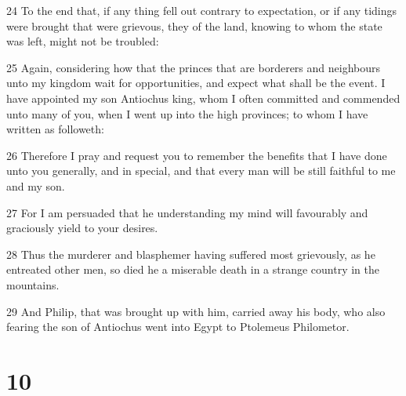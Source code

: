 \par 24 To the end that, if any thing fell out contrary to expectation, or if any tidings were brought that were grievous, they of the land, knowing to whom the state was left, might not be troubled:
\par 25 Again, considering how that the princes that are borderers and neighbours unto my kingdom wait for opportunities, and expect what shall be the event. I have appointed my son Antiochus king, whom I often committed and commended unto many of you, when I went up into the high provinces; to whom I have written as followeth:
\par 26 Therefore I pray and request you to remember the benefits that I have done unto you generally, and in special, and that every man will be still faithful to me and my son.
\par 27 For I am persuaded that he understanding my mind will favourably and graciously yield to your desires.
\par 28 Thus the murderer and blasphemer having suffered most grievously, as he entreated other men, so died he a miserable death in a strange country in the mountains.
\par 29 And Philip, that was brought up with him, carried away his body, who also fearing the son of Antiochus went into Egypt to Ptolemeus Philometor.

\chapter{10}

